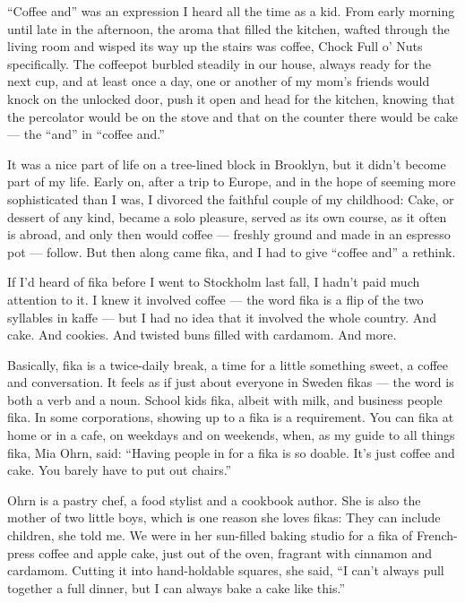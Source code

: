 ``Coffee and'' was an expression I heard all the time as a kid. From
early morning until late in the afternoon, the aroma that filled the
kitchen, wafted through the living room and wisped its way up the stairs
was coffee, Chock Full o' Nuts specifically. The coffeepot burbled
steadily in our house, always ready for the next cup, and at least once
a day, one or another of my mom's friends would knock on the unlocked
door, push it open and head for the kitchen, knowing that the percolator
would be on the stove and that on the counter there would be cake ---
the ``and'' in ``coffee and.''

It was a nice part of life on a tree-lined block in Brooklyn, but it
didn't become part of my life. Early on, after a trip to Europe, and in
the hope of seeming more sophisticated than I was, I divorced the
faithful couple of my childhood: Cake, or dessert of any kind, became a
solo pleasure, served as its own course, as it often is abroad, and only
then would coffee --- freshly ground and made in an espresso pot ---
follow. But then along came fika, and I had to give ``coffee and'' a
rethink.

If I'd heard of fika before I went to Stockholm last fall, I hadn't paid
much attention to it. I knew it involved coffee --- the word fika is a
flip of the two syllables in kaffe --- but I had no idea that it
involved the whole country. And cake. And cookies. And twisted buns
filled with cardamom. And more.

Basically, fika is a twice-daily break, a time for a little something
sweet, a coffee and conversation. It feels as if just about everyone in
Sweden fikas --- the word is both a verb and a noun. School kids fika,
albeit with milk, and business people fika. In some corporations,
showing up to a fika is a requirement. You can fika at home or in a
cafe, on weekdays and on weekends, when, as my guide to all things fika,
Mia Ohrn, said: ``Having people in for a fika is so doable. It's just
coffee and cake. You barely have to put out chairs.''

Ohrn is a pastry chef, a food stylist and a cookbook author. She is also
the mother of two little boys, which is one reason she loves fikas: They
can include children, she told me. We were in her sun-filled baking
studio for a fika of French-press coffee and apple cake, just out of the
oven, fragrant with cinnamon and cardamom. Cutting it into hand-holdable
squares, she said, ``I can't always pull together a full dinner, but I
can always bake a cake like this.''

